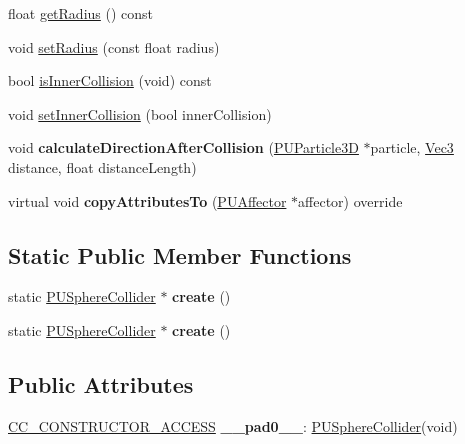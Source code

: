 \begin{DoxyCompactItemize}
\item 
float \hyperlink{classPUSphereCollider_af2a9f80cc6cf89766a41d7244f9fe3e2}{get\+Radius} () const
\item 
void \hyperlink{classPUSphereCollider_ab3063655165ec183d0e0c8d49a61e29c}{set\+Radius} (const float radius)
\item 
bool \hyperlink{classPUSphereCollider_ae9d8719922d5c5650acca47ca71ac203}{is\+Inner\+Collision} (void) const
\item 
void \hyperlink{classPUSphereCollider_afd5152513a9f7e83e4da0fb6f817daf3}{set\+Inner\+Collision} (bool inner\+Collision)
\item 
\mbox{\label{classPUSphereCollider_af21786180605ce1e8ef8044caf352c35}} 
void {\bfseries calculate\+Direction\+After\+Collision} (\hyperlink{structPUParticle3D}{P\+U\+Particle3D} $\ast$particle, \hyperlink{classVec3}{Vec3} distance, float distance\+Length)
\item 
\mbox{\label{classPUSphereCollider_a14c2b806c33c22d44068ee8005c655c1}} 
virtual void {\bfseries copy\+Attributes\+To} (\hyperlink{classPUAffector}{P\+U\+Affector} $\ast$affector) override
\end{DoxyCompactItemize}
\subsection*{Static Public Member Functions}
\begin{DoxyCompactItemize}
\item 
\mbox{\label{classPUSphereCollider_a44b74cf77e04d2466374d9516bbe33b7}} 
static \hyperlink{classPUSphereCollider}{P\+U\+Sphere\+Collider} $\ast$ {\bfseries create} ()
\item 
\mbox{\label{classPUSphereCollider_a39c04a7bdf5173f9062f52e3a6184560}} 
static \hyperlink{classPUSphereCollider}{P\+U\+Sphere\+Collider} $\ast$ {\bfseries create} ()
\end{DoxyCompactItemize}
\subsection*{Public Attributes}
\begin{DoxyCompactItemize}
\item 
\mbox{\label{classPUSphereCollider_a140e09f4ecdffce1bfcffaf012c1e654}} 
\hyperlink{_2cocos2d_2cocos_2base_2ccConfig_8h_a25ef1314f97c35a2ed3d029b0ead6da0}{C\+C\+\_\+\+C\+O\+N\+S\+T\+R\+U\+C\+T\+O\+R\+\_\+\+A\+C\+C\+E\+SS} {\bfseries \+\_\+\+\_\+pad0\+\_\+\+\_\+}\+: \hyperlink{classPUSphereCollider}{P\+U\+Sphere\+Collider}(void)
\end{DoxyCompactItemize}
